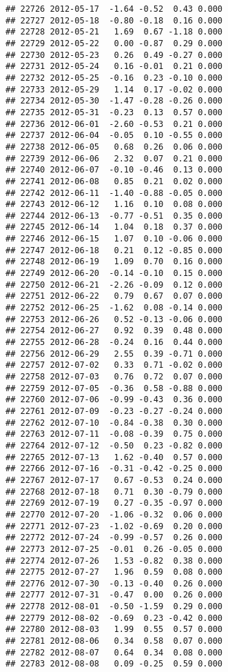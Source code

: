 \documentclass[
]{article}
\begin{document}
\begin{verbatim}
## 22726 2012-05-17  -1.64 -0.52  0.43 0.000
## 22727 2012-05-18  -0.80 -0.18  0.16 0.000
## 22728 2012-05-21   1.69  0.67 -1.18 0.000
## 22729 2012-05-22   0.00 -0.87  0.29 0.000
## 22730 2012-05-23   0.26  0.49 -0.27 0.000
## 22731 2012-05-24   0.16 -0.01  0.21 0.000
## 22732 2012-05-25  -0.16  0.23 -0.10 0.000
## 22733 2012-05-29   1.14  0.17 -0.02 0.000
## 22734 2012-05-30  -1.47 -0.28 -0.26 0.000
## 22735 2012-05-31  -0.23  0.13  0.57 0.000
## 22736 2012-06-01  -2.60 -0.53  0.21 0.000
## 22737 2012-06-04  -0.05  0.10 -0.55 0.000
## 22738 2012-06-05   0.68  0.26  0.06 0.000
## 22739 2012-06-06   2.32  0.07  0.21 0.000
## 22740 2012-06-07  -0.10 -0.46  0.13 0.000
## 22741 2012-06-08   0.85  0.21  0.02 0.000
## 22742 2012-06-11  -1.40 -0.88 -0.05 0.000
## 22743 2012-06-12   1.16  0.10  0.08 0.000
## 22744 2012-06-13  -0.77 -0.51  0.35 0.000
## 22745 2012-06-14   1.04  0.18  0.37 0.000
## 22746 2012-06-15   1.07  0.10 -0.06 0.000
## 22747 2012-06-18   0.21  0.12 -0.85 0.000
## 22748 2012-06-19   1.09  0.70  0.16 0.000
## 22749 2012-06-20  -0.14 -0.10  0.15 0.000
## 22750 2012-06-21  -2.26 -0.09  0.12 0.000
## 22751 2012-06-22   0.79  0.67  0.07 0.000
## 22752 2012-06-25  -1.62  0.08 -0.14 0.000
## 22753 2012-06-26   0.52 -0.13 -0.06 0.000
## 22754 2012-06-27   0.92  0.39  0.48 0.000
## 22755 2012-06-28  -0.24  0.16  0.44 0.000
## 22756 2012-06-29   2.55  0.39 -0.71 0.000
## 22757 2012-07-02   0.33  0.71 -0.02 0.000
## 22758 2012-07-03   0.76  0.72  0.07 0.000
## 22759 2012-07-05  -0.36  0.58 -0.88 0.000
## 22760 2012-07-06  -0.99 -0.43  0.36 0.000
## 22761 2012-07-09  -0.23 -0.27 -0.24 0.000
## 22762 2012-07-10  -0.84 -0.38  0.30 0.000
## 22763 2012-07-11  -0.08 -0.39  0.75 0.000
## 22764 2012-07-12  -0.50  0.23 -0.82 0.000
## 22765 2012-07-13   1.62 -0.40  0.57 0.000
## 22766 2012-07-16  -0.31 -0.42 -0.25 0.000
## 22767 2012-07-17   0.67 -0.53  0.24 0.000
## 22768 2012-07-18   0.71  0.30 -0.79 0.000
## 22769 2012-07-19   0.27 -0.35 -0.97 0.000
## 22770 2012-07-20  -1.06 -0.32  0.06 0.000
## 22771 2012-07-23  -1.02 -0.69  0.20 0.000
## 22772 2012-07-24  -0.99 -0.57  0.26 0.000
## 22773 2012-07-25  -0.01  0.26 -0.05 0.000
## 22774 2012-07-26   1.53 -0.82  0.38 0.000
## 22775 2012-07-27   1.96  0.59  0.08 0.000
## 22776 2012-07-30  -0.13 -0.40  0.26 0.000
## 22777 2012-07-31  -0.47  0.00  0.26 0.000
## 22778 2012-08-01  -0.50 -1.59  0.29 0.000
## 22779 2012-08-02  -0.69  0.23 -0.42 0.000
## 22780 2012-08-03   1.99  0.55  0.57 0.000
## 22781 2012-08-06   0.34  0.58  0.07 0.000
## 22782 2012-08-07   0.64  0.34  0.08 0.000
## 22783 2012-08-08   0.09 -0.25  0.59 0.000

\end{verbatim}
\end{document}

